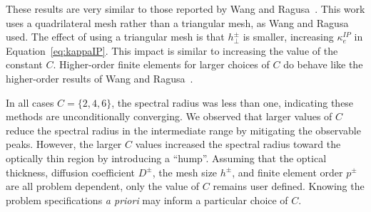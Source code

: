\documentclass[12pt,letterpaper]{article}
\begin{document}
These results are very similar to those reported by Wang and Ragusa~\cite{WangRagusaDSA}. This work uses a quadrilateral mesh rather than a triangular mesh, as Wang and Ragusa~\cite{WangRagusaDSA} used. The effect of using a triangular mesh is that $h_\perp^\pm$ is smaller, increasing $\kappa_e^{IP}$ in Equation~\ref{eq:kappaIP}. This impact is similar to increasing the value of the constant $C$. Higher-order finite elements for larger choices of $C$ do behave like the higher-order results of Wang and Ragusa~\cite{WangRagusaDSA}.

In all cases $C=\{2,4,6\}$, the spectral radius was less than one, indicating these methods are unconditionally converging. We observed that larger values of $C$ reduce the spectral radius in the intermediate range by mitigating the observable peaks. However, the larger $C$ values increased the spectral radius toward the optically thin region by introducing a ``hump''. Assuming that the optical thickness, diffusion coefficient $D^\pm$, the mesh size $h^\pm$, and finite element order $p^\pm$ are all problem dependent, only the value of $C$ remains user defined. Knowing the problem specifications {\em a priori} may inform a particular choice of $C$.
\end{document}
